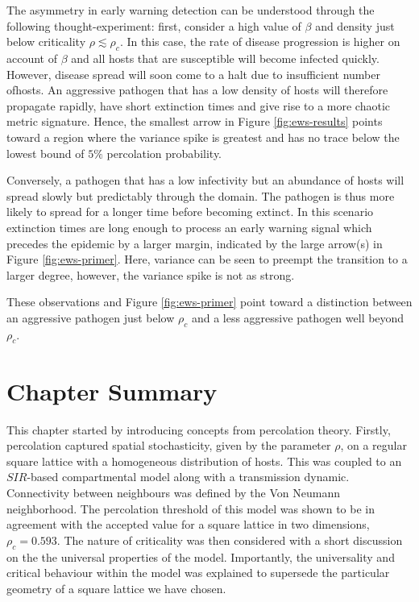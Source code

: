 The asymmetry in early warning detection can be understood through the following thought-experiment: %
first, consider a high value of $\beta$ and density just below criticality $\rho\lesssim\rho_c$. %
In this case, the rate of disease progression is higher on account of $\beta$ and all hosts %
that are susceptible will become infected quickly. %
However, disease spread will soon come to a halt due to insufficient number ofhosts. %
An aggressive pathogen that has a low density of hosts will therefore propagate rapidly, %
have short extinction times and give rise to a more chaotic metric signature. %
Hence, the smallest arrow in Figure \ref{fig:ews-results} points toward a region where the %
variance spike is greatest and has no trace below the lowest bound of $5\%$ percolation probability. %

Conversely, a pathogen that has a low infectivity but an abundance of hosts will spread %
slowly but predictably through the domain. The pathogen is thus more likely to spread for a longer time before becoming extinct. In this scenario extinction times are long enough to process an early warning signal which precedes the epidemic by a larger margin, indicated by the large arrow(s) in Figure \ref{fig:ews-primer}. Here, variance can be seen to preempt the transition to a larger degree, however, the variance spike is not as strong.
 
These observations and Figure \ref{fig:ews-primer} point toward a distinction between an %
aggressive pathogen just below $\rho_c$ and a less aggressive pathogen well beyond $\rho_c$. %
 
\section{Chapter Summary}

This chapter started by introducing concepts from percolation theory. %
Firstly, percolation captured spatial stochasticity, given by the parameter $\rho$, on a regular square %
lattice with a homogeneous distribution of hosts. %
This was coupled to an $SIR$-based compartmental model along with a transmission dynamic. %
Connectivity between neighbours was defined by the Von Neumann neighborhood. %
The percolation threshold of this model was shown to be in agreement with the accepted value %
for a square lattice in two dimensions, $\rho_c = 0.593$. The nature of %
criticality was then considered with a short discussion on the  the universal properties of the model. %
Importantly, the universality and critical behaviour within the model was explained to supersede %
the particular geometry of a square lattice we have chosen. %

